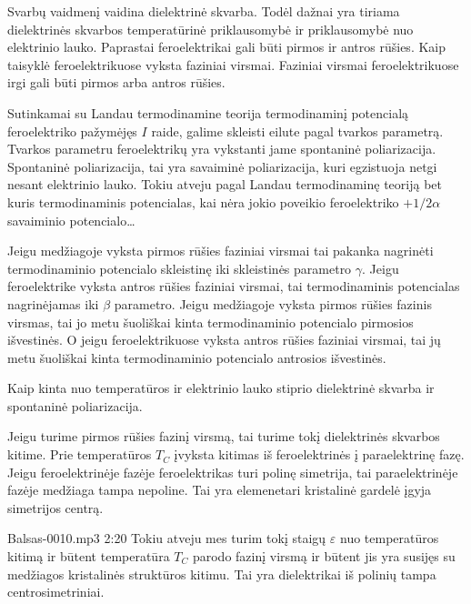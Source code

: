 \begin{note}
  Svarbų vaidmenį vaidina dielektrinė skvarba. Todėl dažnai yra
  tiriama dielektrinės skvarbos temperatūrinė priklausomybė ir
  priklausomybė nuo elektrinio lauko. Paprastai feroelektrikai
  gali būti pirmos ir antros rūšies. Kaip taisyklė
  feroelektrikuose vyksta faziniai virsmai. Faziniai virsmai
  feroelektrikuose irgi gali būti pirmos arba antros rūšies.

  Sutinkamai su Landau termodinamine teorija termodinaminį
  potencialą feroelektriko pažymėjęs $I$ raide, galime
  skleisti eilute pagal tvarkos parametrą. Tvarkos parametru
  feroelektrikų yra vykstanti jame spontaninė poliarizacija.
  Spontaninė poliarizacija, tai yra savaiminė poliarizacija,
  kuri egzistuoja netgi nesant elektrinio lauko. Tokiu
  atveju pagal Landau termodinaminę teoriją bet kuris
  termodinaminis potencialas, kai nėra jokio poveikio
  feroelektriko $+ 1/2 \alpha$ savaiminio potencialo…

  Jeigu medžiagoje vyksta pirmos rūšies faziniai virsmai tai
  pakanka nagrinėti termodinaminio potencialo skleistinę iki
  skleistinės parametro $\gamma$. Jeigu feroelektrike vyksta
  antros rūšies faziniai virsmai, tai termodinaminis
  potencialas nagrinėjamas iki $\beta$ parametro. Jeigu
  medžiagoje vyksta pirmos rūšies fazinis virsmas, tai jo
  metu šuoliškai kinta termodinaminio potencialo pirmosios
  išvestinės. O jeigu feroelektrikuose vyksta antros rūšies faziniai
  virsmai, tai jų metu šuoliškai kinta termodinaminio potencialo
  antrosios išvestinės.
  
  Kaip kinta nuo temperatūros ir elektrinio lauko stiprio dielektrinė
  skvarba ir spontaninė poliarizacija.

  Jeigu turime pirmos rūšies fazinį virsmą, tai turime tokį dielektrinės
  skvarbos kitime. Prie temperatūros $T_{C}$ įvyksta kitimas iš
  feroelektrinės į paraelektrinę fazę. Jeigu feroelektrinėje fazėje
  feroelektrikas turi polinę simetrija, tai paraelektrinėje
  fazėje medžiaga tampa nepoline. Tai yra elemenetari kristalinė
  gardelė įgyja simetrijos centrą.
   
  Balsas-0010.mp3 2:20
  Tokiu atveju mes turim tokį staigų $\varepsilon$ nuo temperatūros
  kitimą ir būtent temperatūra $T_{C}$ parodo fazinį virsmą ir būtent
  jis yra susijęs su medžiagos kristalinės struktūros kitimu.
  Tai yra dielektrikai iš polinių tampa centrosimetriniai.


\end{note}
